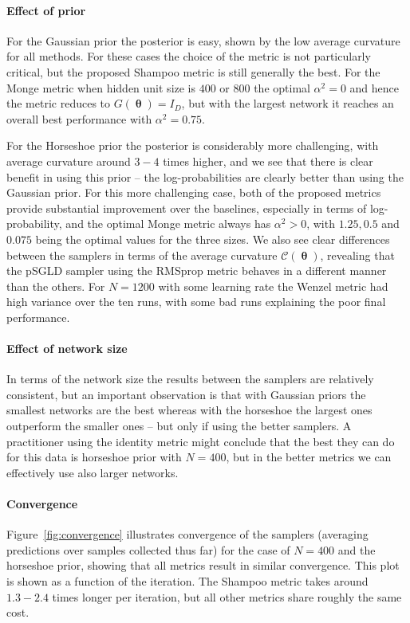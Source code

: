 \documentclass[10pt]{article} %
\DeclareMathOperator{\btheta}{\boldsymbol{\theta}}
\theoremstyle{plain}
\theoremstyle{definition}
\theoremstyle{remark}
\begin{document}
\paragraph{Effect of prior}
For the Gaussian prior the posterior is easy, shown by the low average curvature for all methods. For these cases the choice of the metric is not particularly critical, but the proposed Shampoo metric is still generally the best. For the Monge metric when hidden unit size is $400$ or $800$ the optimal $\alpha^{2}=0$ and hence the metric reduces to $G(\btheta)=I_{D}$, but with the largest network it reaches an overall best performance with $\alpha^{2}=0.75$.

For the Horseshoe prior the posterior is considerably more challenging, with average curvature around $3-4$ times higher, and we see that there is clear benefit in using this prior -- the log-probabilities are clearly better than using the Gaussian prior. For this more challenging case, both of the proposed metrics provide substantial improvement over the baselines, especially in terms of log-probability, and the optimal Monge metric always has $\alpha^{2}>0$, with $1.25, 0.5$ and $0.075$ being the optimal values for the three sizes. We also see clear differences between the samplers in terms of the average curvature $\mathcal{C}(\btheta)$, revealing that the pSGLD sampler using the RMSprop metric behaves in a different manner than the others.
For $N=1200$ with some learning rate the Wenzel metric had high variance over the ten runs, with some bad runs explaining the poor final performance.

\paragraph{Effect of network size}
In terms of the network size the results between the samplers are relatively consistent, but an important observation is that with Gaussian priors the smallest networks are the best whereas with the horseshoe the largest ones outperform the smaller ones -- but only if using the better samplers. A practitioner using the identity metric might conclude that the best they can do for this data is horseshoe prior with $N=400$, but in the better metrics we can effectively use also larger networks.

\paragraph{Convergence}
Figure~\ref{fig:convergence} illustrates convergence of the samplers (averaging predictions over samples collected thus far) for the case of $N=400$ and the horseshoe prior, showing that all metrics result in similar convergence.
This plot is shown as a function of the iteration. The Shampoo metric takes around $1.3-2.4$ times longer per iteration, but all other metrics share roughly the same cost.
\end{document}
